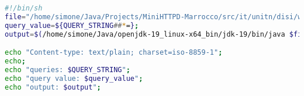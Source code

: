 \begin{lstlisting}[language=bash,caption={file bash used to call ReverseString.java}]
#!/bin/sh
file="/home/simone/Java/Projects/MiniHTTPD-Marrocco/src/it/unitn/disi/webarch/tinyhttpd/ReverseString.java";
query_value=${QUERY_STRING##*=};
output=$(/home/simone/Java/openjdk-19_linux-x64_bin/jdk-19/bin/java $file $query_value);

echo "Content-type: text/plain; charset=iso-8859-1";
echo;
echo "queries: $QUERY_STRING";
echo "query value: $query_value";
echo "output: $output";
\end{lstlisting} 